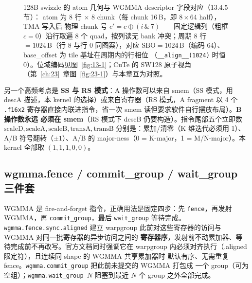 \begin{figure}[H]
\caption{128B swizzle 的 atom 几何与 WGMMA descriptor 字段对应（13.4.5 节）：
atom 为 8 行 $\times$ 8 chunk（每 chunk 16\,B，即 $8\times64$ half），TMA 写入后
物理 chunk 号 $c'=c\oplus(i\,\&\,7)$——固定逻辑列（粗框 $c{=}0$）沿行取遍 8 个
quad，按列读无 bank 冲突；周期 8 行 $=1024$\,B（行 8 与行 0 同图案），对应
$\mathrm{SBO}=1024$\,B（编码 64）、base\_offset 为 tile 基址在周期内的行相位
（\texttt{\_\_align\_\_(1024)} 时恒 0）。位域编码见图~\ref{fig:13-1}；CuTe 的 SW128
原子视角（第~\ref{ch:23}~章图~\ref{fig:23-1}）与本章互为对照。}
\label{fig:13-swizzle-atom}
\end{figure}

另一个高频考点是 \textbf{SS 与 RS 模式}：A 操作数可以来自 smem（SS 模式，用 descA
描述，本 kernel 的选择）或来自寄存器（RS 模式，A fragment 以 4 个 \texttt{.f16x2}
寄存器直接内联进指令，省一次 smem 读但要求软件自行摆放布局）。\textbf{B 操作数永远
必须在 smem}（RS 模式下 descB 仍要构造）。指令尾部五个立即数
$\mathrm{scaleD}, \mathrm{scaleA}, \mathrm{scaleB}, \mathrm{transA}, \mathrm{transB}$
分别是：累加/清零（K 维迭代必须用 1）、A/B 符号翻转（$\pm 1$）、A/B 的
major-ness（0 = K-major，1 = M/N-major）。本 kernel 全部取 $(1, 1, 1, 0, 0)$。

\subsection{wgmma.fence / commit\_group / wait\_group 三件套}



WGMMA 是 fire-and-forget 指令，正确用法是固定四步：先 \texttt{fence}，再发射
WGMMA，再 \texttt{commit\_\allowbreak{}group}，最后 \texttt{wait\_group} 等待完成。
\texttt{wgmma.\allowbreak{}fence.\allowbreak{}sync.\allowbreak{}aligned}
建立 warpgroup 此前对这些寄存器的访问与 WGMMA 对同一批寄存器的异步访问之间的
\textbf{寄存器序}，发射前不动累加器、等待完成前不再改写。官方文档同时强调它在
warpgroup 内必须对齐执行（.aligned 限定符），且连续同 shape 的 WGMMA 共享累加器时
默认有序、无需重复 fence。\texttt{wgmma.\allowbreak{}commit\_\allowbreak{}group} 把此前未提交的 WGMMA 打包成
一个 group（可为空组）；\texttt{wgmma.\allowbreak{}wait\_\allowbreak{}group~$N$} 阻塞到最近 $N$ 个 group
之外全部完成。

